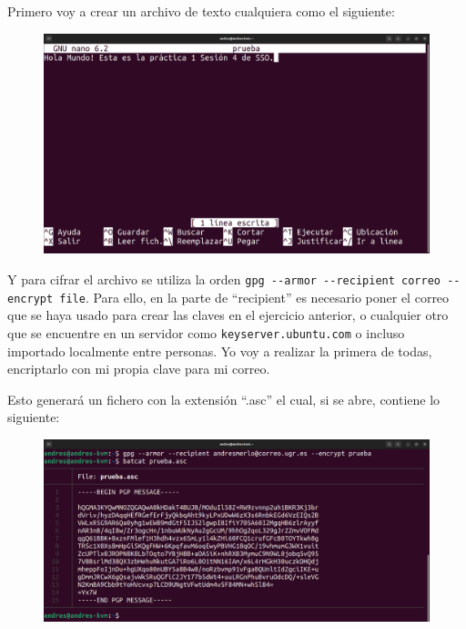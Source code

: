 \documentclass{article}
\begin{document}
Primero voy a crear un archivo de texto cualquiera como el siguiente:

\begin{figure}[H]
    \includegraphics[width=\textwidth]{imagenes/Captura desde 2022-10-19 16-57-15.png}
\end{figure}

Y para cifrar el archivo se utiliza la orden \verb|gpg --armor --recipient correo --encrypt file|. Para ello, en la parte de ``recipient'' es necesario poner el correo que se haya usado para crear las claves en el ejercicio anterior, o cualquier otro que se encuentre en un servidor como \verb|keyserver.ubuntu.com| o incluso importado localmente entre personas. Yo voy a realizar la primera de todas, encriptarlo con mi propia clave para mi correo.

\bigskip

Esto generará un fichero con la extensión ``.asc'' el cual, si se abre, contiene lo siguiente:

\begin{figure}[H]
    \includegraphics[width=\textwidth]{imagenes/Portatil/Captura desde 2022-10-27 18-34-40.png}
\end{figure}
\end{document}
